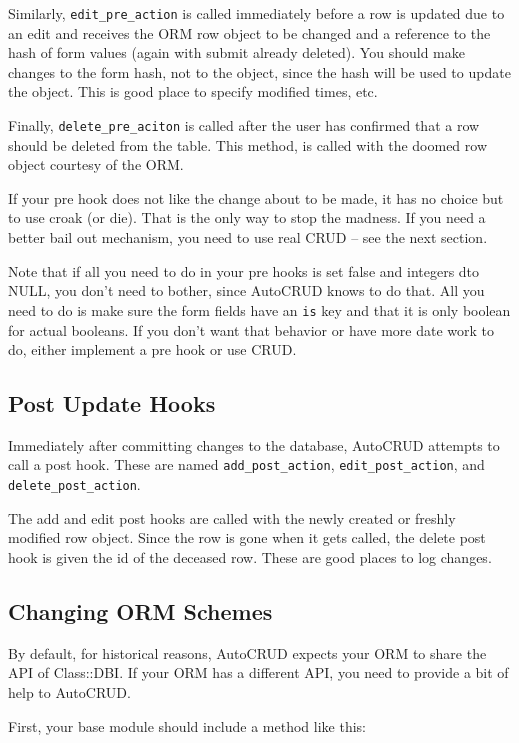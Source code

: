 Similarly, \verb+edit_pre_action+ is called immediately before a row
is updated due to an edit and receives the ORM row object to be changed
and a reference to the hash of form values (again with submit already
deleted).  You should make changes to the form hash, not to the object,
since the hash will be used to update the object.  This is good place
to specify modified times, etc.

Finally, \verb+delete_pre_aciton+ is called after the user has confirmed
that a row should be deleted from the table.  This method, is called with
the doomed row object courtesy of the ORM.

If your pre hook does not like the change about to be made, it has no
choice but to use croak (or die).  That is the only way to stop the madness.
If you need a better bail out mechanism, you need to use real CRUD -- see
the next section.

Note that if all you need to do in your pre hooks is set false and integers
dto NULL, you don't need to bother, since AutoCRUD knows to do that.  All
you need to do is make sure the form fields have an \verb+is+ key and that
it is only boolean for actual booleans.  If you don't want that behavior
or have more date work to do, either implement a pre hook or use CRUD.

\subsection*{Post Update Hooks}

Immediately after committing changes to the database, AutoCRUD attempts
to call a post hook.  These are named \verb+add_post_action+,
\verb+edit_post_action+, and \verb+delete_post_action+.  

The add and edit post hooks are called with the newly created or freshly
modified row object.  Since the row is gone when it gets called, the delete
post hook is given the id of the deceased row.  These are good places to log
changes.

\subsection*{Changing ORM Schemes}

By default, for historical reasons, AutoCRUD expects your ORM to
share the API of Class::DBI.  If your ORM has a different API, you
need to provide a bit of help to AutoCRUD.

First, your base module should include a method like this:

